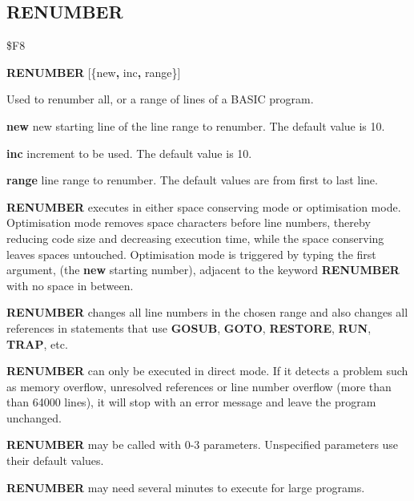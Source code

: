 \subsection{RENUMBER}
\begin{description}[leftmargin=2cm,style=nextline]
\item [Token:] \$F8
\item [Format:] {\bf RENUMBER} [\{new{\bf,} inc{\bf,} range\}]
\item [Usage:] Used to renumber all, or
               a range of lines of a BASIC program.

               {\bf new } new starting line of the
               line range to renumber.
               The default value is 10.

               {\bf inc } increment to be used.
               The default value is 10.

               {\bf range } line range to renumber.
               The default values are from first to last line.

               {\bf RENUMBER} executes in either space conserving mode
               or optimisation mode. Optimisation mode removes space
               characters before line numbers, thereby reducing code size
               and decreasing execution time, while the space conserving
               leaves spaces untouched. Optimisation mode is triggered
               by typing the first argument, (the {\bf new} starting number),
               adjacent to the keyword {\bf RENUMBER} with no space in
               between.

               {\bf RENUMBER} changes all line numbers in
               the chosen range and also changes all references
               in statements that use {\bf GOSUB}, {\bf GOTO},
               {\bf RESTORE}, {\bf RUN}, {\bf TRAP}, etc.

               {\bf RENUMBER} can only be executed in direct mode.
               If it detects a problem such as memory overflow,
               unresolved references or line number overflow
               (more than than 64000 lines), it will stop with an error
               message and leave the program unchanged.

               {\bf RENUMBER} may be called with 0-3 parameters.
               Unspecified parameters use their default values.

\item [Remarks:] {\bf RENUMBER} may need several
                 minutes to execute for large programs.


\end{description}
